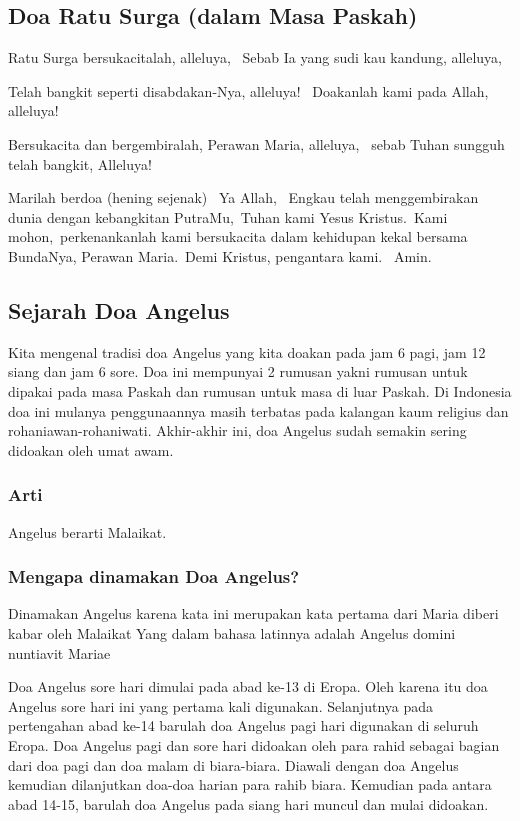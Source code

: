 \subsection*{Doa Ratu Surga (dalam Masa Paskah)}
Ratu Surga bersukacitalah, alleluya,~ Sebab Ia yang sudi kau kandung,
alleluya,~

 Telah bangkit seperti disabdakan-Nya, alleluya!~ Doakanlah kami pada
Allah, alleluya!~

 Bersukacita dan bergembiralah, Perawan Maria, alleluya,~ sebab Tuhan
sungguh telah bangkit, Alleluya!~

Marilah berdoa (hening sejenak)~ Ya Allah,~ Engkau telah menggembirakan
dunia dengan kebangkitan PutraMu,~Tuhan kami Yesus Kristus.~Kami
mohon,~perkenankanlah kami bersukacita dalam kehidupan kekal bersama
BundaNya, Perawan Maria.~Demi Kristus, pengantara kami.~ Amin.

\subsection*{Sejarah Doa Angelus}
Kita mengenal tradisi doa Angelus yang kita doakan pada jam 6 pagi, jam
12 siang dan jam 6 sore. Doa ini mempunyai 2 rumusan yakni rumusan
untuk dipakai pada masa Paskah dan rumusan untuk masa di luar Paskah.
Di Indonesia doa ini mulanya penggunaannya masih terbatas pada kalangan
kaum religius dan rohaniawan-rohaniwati. Akhir-akhir ini, doa Angelus
sudah semakin sering didoakan oleh umat awam.

\subsubsection[Arti]{Arti}
{\textquotedbl}Angelus{\textquotedbl} berarti
{\textquotedbl}Malaikat{\textquotedbl}.

\subsubsection[Mengapa dinamakan Doa Angelus?]{Mengapa dinamakan Doa
Angelus?}
Dinamakan Angelus karena kata ini merupakan kata pertama dari
{\textquotedbl}Maria diberi kabar oleh Malaikat{\textquotedbl} Yang
dalam bahasa latinnya adalah {\textquotedbl}Angelus domini nuntiavit
Mariae{\textquotedbl}

Doa Angelus sore hari dimulai pada abad ke-13 di Eropa. Oleh karena itu
doa Angelus sore hari ini yang pertama kali digunakan. Selanjutnya pada
pertengahan abad ke-14 barulah doa Angelus pagi hari digunakan di
seluruh Eropa. Doa Angelus pagi dan sore hari didoakan oleh para rahid
sebagai bagian dari doa pagi dan doa malam di biara-biara. Diawali
dengan doa Angelus kemudian dilanjutkan doa-doa harian para rahib
biara. Kemudian pada antara abad 14-15, barulah doa Angelus pada siang
hari muncul dan mulai didoakan.

